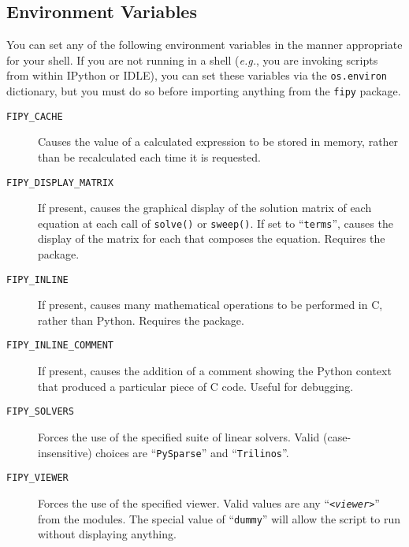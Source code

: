        \subsection{Environment Variables}
        You can set any of the following environment variables in the 
        manner appropriate for your shell. If you are not running in 
        a shell (\emph{e.g.}, you are invoking \FiPy{} scripts from within IPython or 
        IDLE), you can set these variables via the 
        \texttt{os.environ} dictionary, but you must do so before 
        importing anything from the \texttt{fipy} package.
        \begin{description}
            \item[\texttt{FIPY\_CACHE}] Causes the value of a calculated 
             expression to be stored in memory, 
            rather than be recalculated each time it is requested.
            
            \item[\texttt{FIPY\_DISPLAY\_MATRIX}] If present, causes
            the graphical display of the solution matrix of each
            equation at each call of \texttt{solve()} or
            \texttt{sweep()}. If set to ``\texttt{terms}'', causes the
            display of the matrix for each  that composes
            the equation. Requires the \Matplotlib{} package.

            \item[\texttt{FIPY\_INLINE}] If present, causes many
            mathematical operations to be performed in C, rather than
            Python. Requires the \SciPy{} \weave{} package.
        
            \item[\texttt{FIPY\_INLINE\_COMMENT}] If present, causes
            the addition of a comment showing the Python context that
            produced a particular piece of \SciPy{} \weave{} C code.
            Useful for debugging.
        
            \item[\texttt{FIPY\_SOLVERS}] Forces the use of the
            specified suite of linear solvers. Valid
            (case-insensitive) choices are ``\texttt{PySparse}'' and
            ``\texttt{Trilinos}''.
            
            \item[\texttt{FIPY\_VIEWER}] Forces the use of the 
            specified viewer. Valid values are any 
            ``\texttt{\textit{<viewer>}}''
            from the \texttt{} 
            modules. The special value of ``\texttt{dummy}'' will 
            allow the script to run without displaying anything.
        \end{description}



